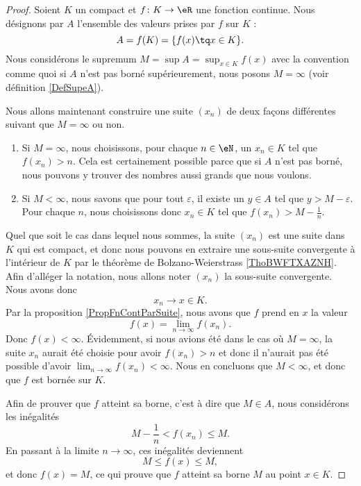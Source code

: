 \begin{proof}
	Soient $K$ un compact et $f\colon K\to \eR$ une fonction continue. Nous désignons par $A$ l'ensemble des valeurs prises par $f$ sur $K$ :
	\begin{equation}
		A=f(K)=\{ f(x)\tq x\in K \}.
	\end{equation}
	Nous considérons le supremum $M=\sup A=\sup_{x\in K}f(x)$ avec la convention comme quoi si $A$ n'est pas borné supérieurement, nous posons $M=\infty$ (voir définition \ref{DefSupeA}).

	Nous allons maintenant construire une suite $(x_n)$ de deux façons différentes suivant que $M=\infty$ ou non.
	\begin{enumerate}
		\item
			Si $M=\infty$, nous choisissons, pour chaque $n\in\eN$, un $x_n\in K$ tel que $f(x_n)>n$. Cela est certainement possible parce que si $A$ n'est pas borné, nous pouvons y trouver des nombres aussi grands que nous voulons.
		\item
			Si $M<\infty$, nous savons que pour tout $\varepsilon$, il existe un $y\in A$ tel que $y>M-\varepsilon$. Pour chaque $n$, nous choisissons donc $x_n\in K$ tel que $f(x_n)>M-\frac{1}{ n }$.
	\end{enumerate}
    Quel que soit le cas dans lequel nous sommes, la suite $(x_n)$ est une suite dans $K$ qui est compact, et donc nous pouvons en extraire une sous-suite convergente à l'intérieur de \( K\) par le théorème de Bolzano-Weierstrass \ref{ThoBWFTXAZNH}. Afin d'alléger la notation, nous allons noter $(x_n)$ la sous-suite convergente. Nous avons donc 
	\begin{equation}
		x_n\to x\in K.
	\end{equation}
	Par la proposition \ref{PropFnContParSuite}, nous avons que $f$ prend en \( x\) la valeur
	\begin{equation}
		f(x)=\lim_{n\to \infty} f(x_n).
	\end{equation}
	Donc $f(x)<\infty$. Évidemment, si nous avions été dans le cas où $M=\infty$, la suite $x_n$ aurait été choisie pour avoir $f(x_n)>n$ et donc il n'aurait pas été possible d'avoir $\lim_{n\to \infty} f(x_n)<\infty$. Nous en concluons que $M<\infty$, et donc que $f$ est bornée sur $K$.

	Afin de prouver que $f$ atteint sa borne, c'est à dire que $M\in A$, nous considérons les inégalités
	\begin{equation}
		M-\frac{1}{ n }<f(x_n)\leq M.
	\end{equation}
	En passant à la limite $n\to \infty$, ces inégalités deviennent
	\begin{equation}
		M\leq f(x)\leq M,
	\end{equation}
	et donc $f(x)=M$, ce qui prouve que $f$ atteint sa borne $M$ au point $x\in K$.
\end{proof}

